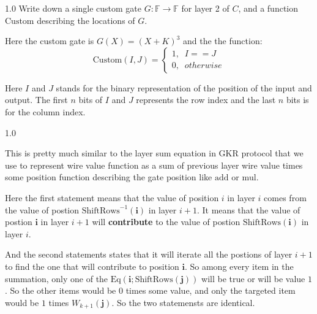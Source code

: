 \documentclass[12pt]{article}
\newenvironment{ex}[2][Exercise]{\begin{trivlist}
\item[\hskip \labelsep {\bfseries #1}\hskip \labelsep {\bfseries #2.}]\begin{spacing}{1.0}}{\end{spacing}\end{trivlist}}
\newenvironment{sol}[1][Solution]{\begin{trivlist}
\item[\hskip \labelsep {\bfseries #1:}]}{\end{trivlist}}
\begin{document}
\begin{ex}{1.b}
    Write down a single custom gate $G: \mathbb{F} \rightarrow \mathbb{F}$ for layer 2 of $C$, and a function $\text{Custom}$ describing the locations of $G$.
\end{ex}

\begin{sol}
    Here the custom gate is $G(X) = (X + K) ^ 3$ and the the function:
    $$
        \text{Custom}(I,J) =
        \begin{cases}
            1, \;\; I == J \\
            0, \;\; otherwise
        \end{cases}
    $$

    Here $I$ and $J$ stands for the binary representation of the position of the input and output. The first $n$ bits of $I$ and $J$ represents the row index and the last $n$ bits is for the column index.

\end{sol}

\begin{ex}{1.c}

\end{ex}

\begin{sol}
    This is pretty much similar to the layer sum equation in GKR protocol that we use to represent wire value function as a sum of previous layer wire value times some position function describing the gate position like $\text{add}$ or $\text{mul}$.

    Here the first statement means that the value of position $\textbf{}{i}$ in layer $i$ comes from the value of postion $\text{ShiftRows}^{-1}(\textbf{i})$ in layer $i+1$. It means that the value of postion $\textbf{i}$ in layer $i+1$ will \textbf{contribute} to the value of postion $\text{ShiftRows}(\textbf{i})$ in layer $i$.

    And the second statements states that it will iterate all the postions of layer $i+1$ to find the one that will contribute to position $\textbf{i}$. So among every item in the summation, only one of the $\text{Eq}(\textbf{i};\text{ShiftRows}(\textbf{j}))$ will be true or will be value $1$. So the other items would be $0$ times some value, and only the targeted item would be $1$ times $W_{k+1}(\textbf{j})$. So the two statemensts are identical.
\end{sol}
\end{document}
